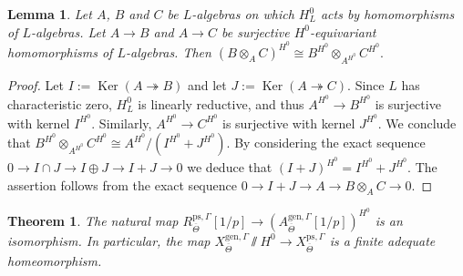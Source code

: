 \documentclass{amsart}
\newtheorem{lem}[prop]{Lemma}
\newtheorem{thm}[prop]{Theorem}
\theoremstyle{definition}
\theoremstyle{remark}
\DeclareMathOperator{\Ker}{Ker}
\newcommand{\gen}{\mathrm{gen}}
\newcommand{\Thetabar}{\overline{\Theta}}
\newcommand{\ps}{\mathrm{ps}}
\begin{document}
\begin{lem}\label{tensor_inv1} Let $A$, $B$ and $C$ be $L$-algebras on which $H^0_L$ acts
by homomorphisms of $L$-algebras. Let $A\rightarrow B$ and $A\rightarrow C$ be surjective $H^0$-equivariant homomorphisms of $L$-algebras. Then 
$(B\otimes_A C)^{H^0}\cong B^{H^0}\otimes_{A^{H^0}} C^{H^0}.$
\end{lem}
\begin{proof} Let $I:= \Ker( A\twoheadrightarrow B)$ and let $J:=\Ker(A\twoheadrightarrow C)$. Since $L$ has characteristic zero, $H^0_L$ is linearly reductive, and thus $A^{H^0}\rightarrow B^{H^0}$
is surjective with kernel $I^{H^0}$. Similarly, 
$A^{H^0}\rightarrow C^{H^0}$ is surjective with kernel $J^{H^0}$. 
We conclude that $B^{H^0}\otimes_{A^{H^0}} C^{H^0} \cong A^{H^0}/(I^{H^0}+ J^{H^0})$. By considering the exact sequence 
$0\rightarrow I\cap J \rightarrow I \oplus J \rightarrow I+J \rightarrow 0$ we deduce that $(I+J)^{H^0}= I^{H^0}+J^{H^0}$. The assertion follows
from the exact sequence $0\rightarrow I+J \rightarrow A\rightarrow B\otimes_A C\rightarrow 0$.
\end{proof} 
\begin{thm}\label{adequate}
    The natural map $R^{\ps, \Gamma}_{\Thetabar}[1/p] \to (A^{\gen, \Gamma}_{\Thetabar}[1/p])^{H^0}$ is an isomorphism.
    In particular, the map 
    $X^{\gen, \Gamma}_{\Thetabar}\sslash H^0 \rightarrow X^{\ps, \Gamma}_{\Thetabar}$  is a finite adequate homeomorphism.
\end{thm}
\end{document}
